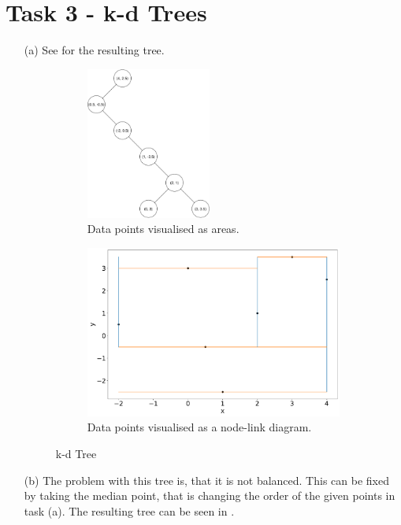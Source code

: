 \documentclass[a4paper]{article}
\begin{document}
\section*{Task 3 - k-d Trees}
\begin{enumerate}
	\item[(a)] See  for the resulting tree.
	\begin{figure}
		\centering
		\begin{subfigure}[t]{.4\textwidth}
			\includegraphics[height=5cm]{2-dtree.pdf}
			\caption{Data points visualised as areas.}
		\end{subfigure}
	\begin{subfigure}[t]{.4\textwidth}
		\includegraphics[width=\linewidth]{2dtree_nodelink.pdf}
		\caption{Data points visualised as a node-link diagram.}
	\end{subfigure}
	\caption{k-d Tree}
	\label{kdtree}
	\end{figure}
	\item[(b)] The problem with this tree is, that it is not balanced. 
	This can be fixed by taking the median point, that is changing the order of the given points in task (a). 
	The resulting tree can be seen in .
	\begin{figure}

\end{figure}
\end{enumerate}
\end{document}
